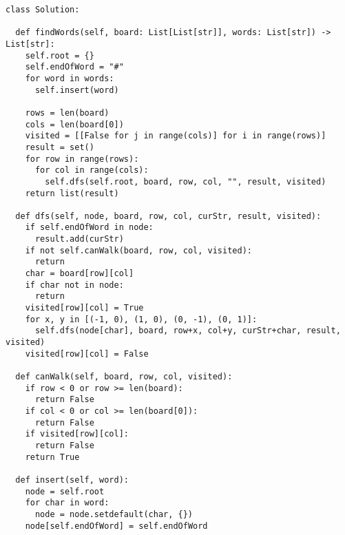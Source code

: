 \begin{verbatim}
class Solution:

  def findWords(self, board: List[List[str]], words: List[str]) -> List[str]:
    self.root = {}
    self.endOfWord = "#"
    for word in words:
      self.insert(word)

    rows = len(board)
    cols = len(board[0])
    visited = [[False for j in range(cols)] for i in range(rows)]
    result = set()
    for row in range(rows):
      for col in range(cols):
        self.dfs(self.root, board, row, col, "", result, visited)
    return list(result)

  def dfs(self, node, board, row, col, curStr, result, visited):
    if self.endOfWord in node:
      result.add(curStr)
    if not self.canWalk(board, row, col, visited):
      return
    char = board[row][col]
    if char not in node:
      return
    visited[row][col] = True
    for x, y in [(-1, 0), (1, 0), (0, -1), (0, 1)]:
      self.dfs(node[char], board, row+x, col+y, curStr+char, result, visited)
    visited[row][col] = False

  def canWalk(self, board, row, col, visited):
    if row < 0 or row >= len(board):
      return False
    if col < 0 or col >= len(board[0]):
      return False
    if visited[row][col]:
      return False
    return True

  def insert(self, word):
    node = self.root
    for char in word:
      node = node.setdefault(char, {})
    node[self.endOfWord] = self.endOfWord
\end{verbatim}


